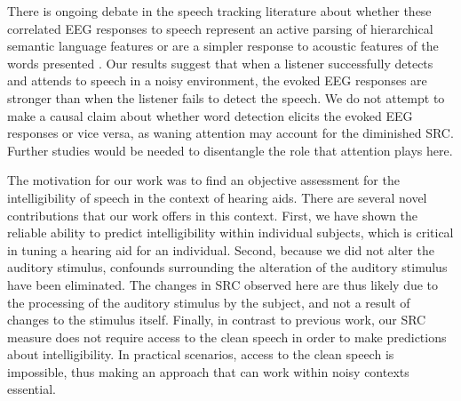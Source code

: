 \documentclass[10pt,letterpaper]{article}
\begin{document}
  There is ongoing debate in the speech tracking literature about whether 
  these correlated EEG responses to speech represent an active parsing of 
  hierarchical semantic language features \cite{Ding2015} or are a simpler 
  response to acoustic features of the words presented \cite{Frank2018}.
  Our results suggest that when a listener successfully detects and attends 
  to speech in a noisy environment, the evoked EEG responses are stronger than 
  when the listener fails to detect the speech. We do not attempt to make a
  causal claim about whether word detection elicits the evoked EEG responses 
  or vice versa, as waning attention may account for the diminished SRC. 
  Further studies would be needed to disentangle the role that attention plays
  here.

  The motivation for our work was to find an objective assessment for the 
  intelligibility of speech in the context of hearing aids. There are several
  novel contributions that our work offers in this context. First, we have 
  shown the reliable ability to predict intelligibility within individual 
  subjects, which is critical in tuning a hearing aid for an individual. 
  Second, because we did not alter the auditory stimulus, confounds surrounding
  the alteration of the auditory stimulus have been eliminated. The changes 
  in SRC observed here are thus likely due to the processing of the auditory
  stimulus by the subject, and not a result of changes to the stimulus itself.
  Finally, in contrast to previous work, our SRC measure does not require
  access to the clean speech in order to make predictions about intelligibility.
  In practical scenarios, access to the clean speech is impossible, thus making
  an approach that can work within noisy contexts essential.




\setlength{\bibleftmargin}{.125in}
\setlength{\bibindent}{-\bibleftmargin}


\end{document}
